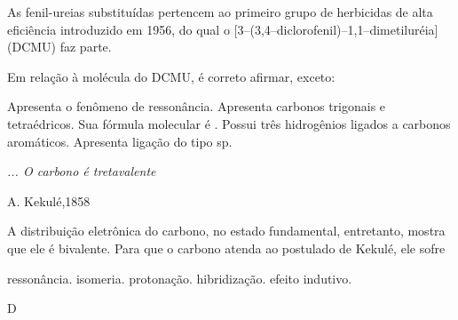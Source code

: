 \documentclass[10pt]{scrartcl}
\begin{document}
\begin{exercise}[points=1]
As fenil-ureias substituídas pertencem ao primeiro grupo de herbicidas de alta eficiência
introduzido em 1956, do qual o [3–(3,4–diclorofenil)–1,1–dimetiluréia] (DCMU) faz parte.

\begin{center}
\end{center}

Em relação à molécula do DCMU, é correto afirmar, exceto:

\begin{choice}
\choice Apresenta o fenômeno de ressonância.
\choice Apresenta carbonos trigonais e tetraédricos.
\choice Sua fórmula molecular é .
\choice Possui três hidrogênios ligados a carbonos aromáticos.
\choice Apresenta ligação do tipo sp.
\end{choice}
\end{exercise}
\begin{solution}

\end{solution}








\begin{exercise}[points=1]
\begin{tcolorbox}[minipage,colback=white,arc=0pt,outer arc=0pt]
{\itshape ... O carbono é tretavalente}
 \par \hspace{2.5cm}
 \scriptsize A. Kekulé,1858
\end{tcolorbox}
A distribuição eletrônica do carbono, no estado fundamental, entretanto, mostra que ele é bivalente. Para que o carbono atenda ao postulado de Kekulé, ele sofre

\begin{choice}
\choice ressonância.
\choice isomeria.
\choice protonação.
\choice hibridização.
\choice efeito indutivo.
\end{choice}
\end{exercise}
\begin{solution}
D
\end{solution}
\end{document}
